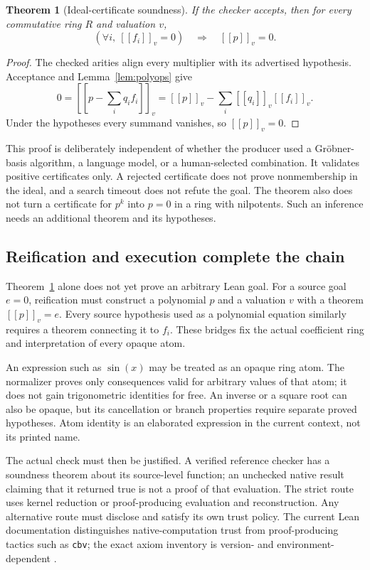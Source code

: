 \documentclass[11pt,letterpaper]{article}
\newcommand{\code}[1]{\nolinkurl{#1}}
\newcommand{\den}[1]{[\![#1]\!]}
\newtheorem{theorem}[definition]{Theorem}
\theoremstyle{remark}
\begin{document}
\begin{theorem}[Ideal-certificate soundness]\label{thm:polycheck}
If the checker accepts, then for every commutative ring $R$ and valuation $v$,
\[
 \left(\forall i,\ \den{f_i}_v=0\right)
     \quad\Longrightarrow\quad \den p_v=0.
\]
\end{theorem}
\begin{proof}
The checked arities align every multiplier with its advertised hypothesis.
Acceptance and Lemma~\ref{lem:polyops} give
\[
 0=\den{p-\sum_i q_i f_i}_v
   =\den p_v-\sum_i\den{q_i}_v\den{f_i}_v.
\]
Under the hypotheses every summand vanishes, so $\den p_v=0$.
\end{proof}

This proof is deliberately independent of whether the producer used a
Gr\"obner-basis algorithm, a language model, or a human-selected combination.
It validates positive certificates only. A rejected certificate does not prove
nonmembership in the ideal, and a search timeout does not refute the goal.
The theorem also does not turn a certificate for $p^k$ into $p=0$ in a ring
with nilpotents. Such an inference needs an additional theorem and its
hypotheses.

\subsection{Reification and execution complete the chain}
Theorem~\ref{thm:polycheck} alone does not yet prove an arbitrary Lean goal.
For a source goal $e=0$, reification must construct a polynomial $p$ and a
valuation $v$ with a theorem $\den p_v=e$. Every source hypothesis used as a
polynomial equation similarly requires a theorem connecting it to $f_i$.
These bridges fix the actual coefficient ring and interpretation of every
opaque atom.

An expression such as $\sin(x)$ may be treated as an opaque ring atom. The
normalizer proves only consequences valid for arbitrary values of that atom;
it does not gain trigonometric identities for free. An inverse or a square root
can also be opaque, but its cancellation or branch properties require separate
proved hypotheses. Atom identity is an elaborated expression in the current
context, not its printed name.

The actual check must then be justified. A verified reference checker has a
soundness theorem about its source-level function; an unchecked native result
claiming that it returned true is not a proof of that evaluation. The strict
route uses kernel reduction or proof-producing evaluation and reconstruction.
Any alternative route must disclose and satisfy its own trust policy. The
current Lean documentation distinguishes native-computation trust from
proof-producing tactics such as \code{cbv}; the exact axiom inventory is
version- and environment-dependent \cite{leantactics,leanaxioms,leanvalidation}.
\end{document}
